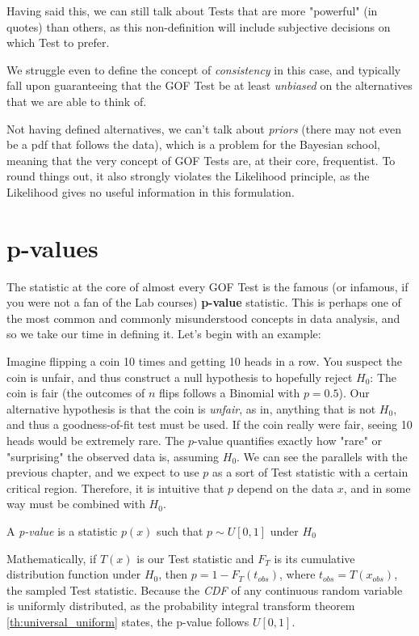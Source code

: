 Having said this, we can still talk about Tests that are more "powerful" (in quotes) than others, as this non-definition will include subjective decisions on which Test to prefer.

We struggle even to define the concept of \emph{consistency} in this case, and typically fall upon guaranteeing that the GOF Test be at least \emph{unbiased} on the alternatives that we are able to think of.

Not having defined alternatives, we can't talk about \emph{priors} (there may not even be a pdf that follows the data), which is a problem for the Bayesian school, meaning that the very concept of GOF Tests are, at their core, frequentist. To round things out, it also strongly violates the Likelihood principle, as the Likelihood gives no useful information in this formulation.

\section{p-values}

The statistic at the core of almost every GOF Test is the famous (or infamous, if you were not a fan of the Lab courses) \textbf{p-value} statistic. This is perhaps one of the most common and commonly misunderstood concepts in data analysis, and so we take our time in defining it. Let's begin with an example:

Imagine flipping a coin 10 times and getting 10 heads in a row. You suspect the coin is unfair, and thus construct a null hypothesis to hopefully reject $H_0$: The coin is fair (the outcomes of $n$ flips follows a Binomial with $p=0.5$). Our alternative hypothesis is that the coin is \emph{unfair}, as in, anything that is not $H_0$, and thus a goodness-of-fit test must be used. If the coin really were fair, seeing 10 heads would be extremely rare. The $p$-value quantifies exactly how "rare" or "surprising" the observed data is, assuming $H_0$. We can see the parallels with the previous chapter, and we expect to use $p$ as a sort of Test statistic with a certain critical region. Therefore, it is intuitive that $p$ depend on the data $x$, and in some way must be combined with $H_0$. 

\begin{definition}[p-value]
	A \emph{p-value} is a statistic $p(x)$ such that $p\sim U[0,1]$ under $H_0$
\end{definition}

Mathematically, if $T(x)$ is our Test statistic and $F_T$ is its cumulative distribution function under $H_0$, then $p = 1 - F_T(t_{obs})$, where $t_{obs} = T(x_{obs})$, the sampled Test statistic. Because the \emph{CDF} of any continuous random variable is uniformly distributed, as the probability integral transform theorem \ref{th:universal_uniform} states, the p-value follows $U[0, 1]$.

